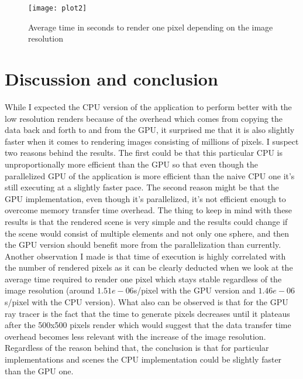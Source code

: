 \begin{figure}[ht] %
\texttt{[image: plot2]}
\centering
\caption{Average time in seconds to render one pixel depending on the image resolution}
\end{figure}

\clearpage

\section{Discussion and conclusion}

While I expected the CPU version of the application to perform better with the low resolution renders because of the overhead which comes from copying the data back and forth to and from the GPU, it surprised me that it is also slightly faster when it comes to rendering images consisting of millions of pixels. I suspect two reasons behind the results. The first could be that this particular CPU is unproportionally more efficient than the GPU so that even though the parallelized GPU of the application is more efficient than the naive CPU one it’s still executing at a slightly faster pace. The second reason might be that the GPU implementation, even though it’s parallelized, it’s not efficient enough to overcome memory transfer time overhead. The thing to keep in mind with these results is that the rendered scene is very simple and the results could change if the scene would consist of multiple elements and not only one sphere, and then the GPU version should benefit more from the parallelization than currently. Another observation I made is that time of execution is highly correlated with the number of rendered pixels as it can be clearly deducted when we look at the average time required to render one pixel which stays stable regardless of the image resolution (around $1.51e-06$s/pixel with the GPU version and $ 1.46e-06 $s/pixel with the CPU version). What also can be observed is that for the GPU ray tracer is the fact that the time to generate pixels decreases until it plateaus after the 500x500 pixels render which would suggest that the data transfer time overhead becomes less relevant with the increase of the image resolution. Regardless of the reason behind that, the conclusion is that for particular implementations and scenes the CPU implementation could be slightly faster than the GPU one.

